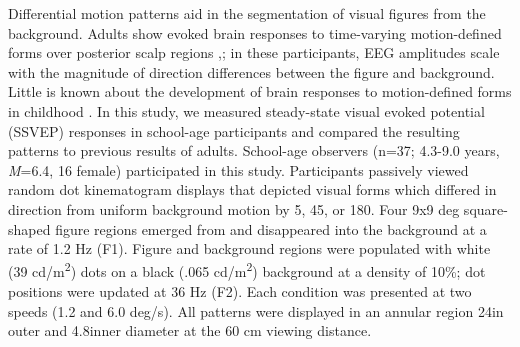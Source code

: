 \documentclass[landscape,final,paperwidth=72in,paperheight=42in,fontscale=0.285]{baposter}
\begin{document}
\begin{poster}
%
    {
      Differential motion patterns aid in the segmentation of visual figures from the background. 
      Adults show evoked brain responses to time-varying motion-defined forms over posterior scalp regions \cite{fesi_cortical_2014},\cite{fesi_distinct_2011}; in these participants, EEG amplitudes scale with the magnitude of direction differences between the figure and background.
      Little is known about the development of brain responses to motion-defined forms in childhood \cite{gilmore_childrens_2016}. In this study, we measured steady-state visual evoked potential (SSVEP) responses in school-age participants and compared the resulting patterns to previous results of adults.    
    }
    {
      School-age observers (n=37; 4.3-9.0 years, \emph{M}=6.4, 16 female) participated in this study.  
      Participants passively viewed random dot kinematogram displays that depicted visual forms which differed in direction from uniform background motion by 5\degree, 45\degree, or 180\degree. Four 9x9 deg square-shaped figure regions emerged from and disappeared into the background at a rate of 1.2 Hz (F1). Figure and background regions were populated with white (39 cd/m\textsuperscript{2}) dots on a black (.065 cd/m\textsuperscript{2}) background at a density of 10\%; dot positions were updated at 36 Hz (F2). Each condition was presented at two speeds (1.2 and 6.0 deg/s). All patterns were displayed in an annular region 24\degree in outer and 4.8\degree inner diameter at the 60 cm viewing distance.  
}
\end{poster}
\end{document}
